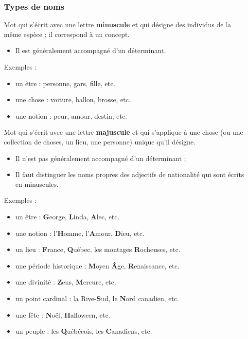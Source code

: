 \documentclass[10pt, french]{article}
\begin{document}
\begin{multicols*}{2}
\subsubsection*{Types de noms}
\begin{definitionNOHFILLsub}
Mot qui s'écrit avec une lettre \textbf{minuscule} et qui désigne des individus de la même espèce ; il correspond à un concept.

\begin{itemize}
	\item	Il est généralement accompagné d'un déterminant.
\end{itemize}

\tcbline

Exemples :
\begin{itemize}
	\item	un être : personne, gars, fille, etc.
	\item	une chose : voiture, ballon, brosse, etc.
	\item	une notion : peur, amour, destin, etc.
\end{itemize}
\end{definitionNOHFILLsub}
\begin{definitionNOHFILLsub}
Mot qui s'écrit avec une lettre \textbf{majuscule} et qui s'applique à une chose (ou une collection de choses, un lieu, une personne) unique qu'il désigne.

\begin{itemize}
	\item	Il n'est pas généralement accompagné d'un déterminant ;
	\item	Il faut distinguer les noms propres des adjectifs de nationalité qui sont écrits en minuscules.
\end{itemize}

\tcbline

Exemples :
\begin{itemize}
	\item	un être : \textbf{G}eorge, \textbf{L}inda, \textbf{A}lec, etc.
	\item	une notion : l'\textbf{H}omme, l'\textbf{A}mour, \textbf{D}ieu, etc.
	\item	un lieu : \textbf{F}rance, \textbf{Q}uébec, les montages \textbf{R}ocheuses, etc.
	\item	une période historique : \textbf{M}oyen \textbf{Â}ge, \textbf{R}enaissance, etc.
	\item	une divinité : \textbf{Z}eus, \textbf{M}ercure, etc.
	\item	un point cardinal : la Rive-\textbf{S}ud, le \textbf{N}ord canadien, etc.
	\item	une fête : \textbf{N}oël, \textbf{H}alloween, etc.
	\item	un peuple : les \textbf{Q}uébécois, les \textbf{C}anadiens, etc.
\end{itemize}
\end{definitionNOHFILLsub}



\end{multicols*}
\end{document}
